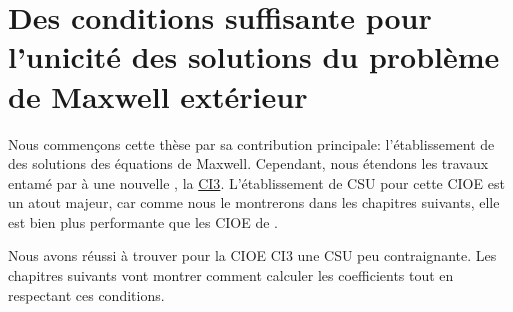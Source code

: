 \chapter[Des CSU des solutions du problème de Maxwell extérieur]{Des conditions suffisante pour l'unicité des solutions du problème de Maxwell extérieur}
\label{sec:csu}
\minitoc
\newpage
{}
Nous commençons cette thèse par sa contribution principale: l'établissement de  des solutions des équations de Maxwell. Cependant, nous étendons les travaux entamé par \cite{stupfel_sufficient_2011} à une nouvelle , la \hyperlink{ci3}{CI3}. L'établissement de CSU pour cette CIOE est un atout majeur, car comme nous le montrerons dans les chapitres suivants, elle est bien plus performante que les CIOE de \cite{stupfel_sufficient_2011}.



Nous avons réussi à trouver pour la CIOE CI3 une CSU peu contraignante. Les chapitres suivants vont montrer comment calculer les coefficients tout en respectant ces conditions.